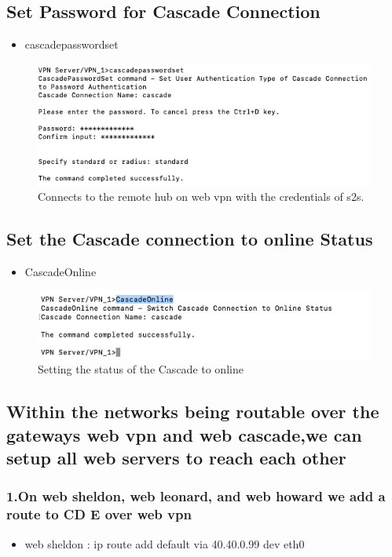 \subsection{Set Password for Cascade Connection}
\begin{itemize}
    \item cascadepasswordset
\end{itemize}
\begin{figure}[H]
\centering
  \includegraphics[width=1\textwidth]{Images/cascadepassword.png}
  \caption{Connects to the remote hub on web vpn with the credentials of s2s. }
  \label{fig }
\end{figure}
\subsection{Set the Cascade connection to online Status}
\begin{itemize}
    \item CascadeOnline
\end{itemize}
\begin{figure}[H]
\centering
  \includegraphics[width=1\textwidth]{Images/cascadeonline.png}
  \caption{Setting the status of the Cascade to online }
  \label{fig }
\end{figure}
\subsection{Within the networks being routable over the gateways web vpn and web cascade,we can setup all web servers to reach each other}
\subsubsection{1.On web sheldon, web leonard, and web howard we add a route to CD E over web vpn}
\begin{itemize}
    \item web sheldon : ip route add default via 40.40.0.99 dev eth0
\end{itemize}
